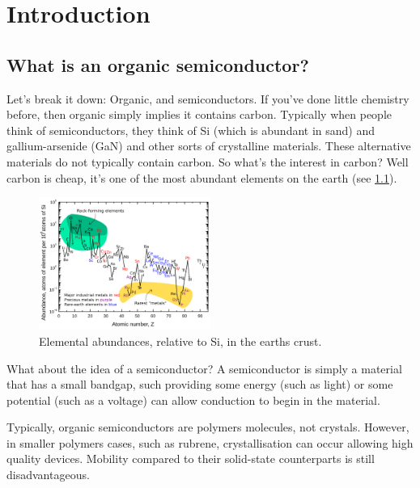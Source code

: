 \documentclass[../main.tex]{subfiles}
\begin{document}
    \chapter{Introduction}\label{chap:01-intro}
	
	\section{What is an organic semiconductor?}
	Let's break it down: Organic, and semiconductors.
	If you've done little chemistry before, then organic simply implies it contains carbon. Typically when people think of semiconductors, they think of Si (which is abundant in sand) and gallium-arsenide (GaN) and other sorts of crystalline materials. These alternative materials do not typically contain carbon.
	So what's the interest in carbon? Well carbon is cheap, it's one of the most abundant elements on the earth (see \cref{fig:ch1-elemental_abundance}).
	\begin{figure}[H]
		\centering
		\includegraphics[width=0.5\textwidth]{resources/ch1/elemental-abundances}
		\caption{Elemental abundances, relative to Si, in the earths crust.\autocite{haxel_rare_2005}}
		\label{fig:ch1-elemental_abundance}
	\end{figure}
	
	What about the idea of a semiconductor? A semiconductor is simply a material that has a small bandgap, such providing some energy (such as light) or some potential (such as a voltage) can allow conduction to begin in the material.
	
	Typically, organic semiconductors are polymers molecules, not crystals. However, in smaller polymers cases, such as rubrene\autocite{wang_highly_2023}, crystallisation can occur allowing high quality devices. Mobility compared to their solid-state counterparts is still disadvantageous.

\ifSubfilesClassLoaded{
    \printbibliography{}
    \printglossaries
}{} %
    
\end{document}
